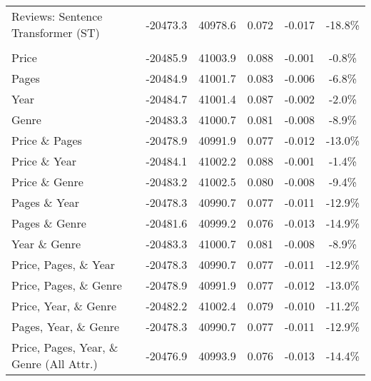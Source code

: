 {\begin{tabular}{l c c c c c}
Reviews: Sentence Transformer (ST) & -20473.3 & 40978.6 & 0.072 & -0.017 & -18.8\% \\
\addlinespace
\multicolumn{6}{l}{\textbf{\textit{Panel C. Attribute-Based Mixed Logit Models}}} \\
\addlinespace
Price & -20485.9 & 41003.9 & 0.088 & -0.001 & -0.8\% \\
Pages & -20484.9 & 41001.7 & 0.083 & -0.006 & -6.8\% \\
Year & -20484.7 & 41001.4 & 0.087 & -0.002 & -2.0\% \\
Genre & -20483.3 & 41000.7 & 0.081 & -0.008 & -8.9\% \\
Price \& Pages & -20478.9 & 40991.9 & 0.077 & -0.012 & -13.0\% \\
Price \& Year & -20484.1 & 41002.2 & 0.088 & -0.001 & -1.4\% \\
Price \& Genre & -20483.2 & 41002.5 & 0.080 & -0.008 & -9.4\% \\
Pages \& Year & -20478.3 & 40990.7 & 0.077 & -0.011 & -12.9\% \\
Pages \& Genre & -20481.6 & 40999.2 & 0.076 & -0.013 & -14.9\% \\
Year \& Genre & -20483.3 & 41000.7 & 0.081 & -0.008 & -8.9\% \\
Price, Pages, \& Year & -20478.3 & 40990.7 & 0.077 & -0.011 & -12.9\% \\
Price, Pages, \& Genre & -20478.9 & 40991.9 & 0.077 & -0.012 & -13.0\% \\
Price, Year, \& Genre & -20482.2 & 41002.4 & 0.079 & -0.010 & -11.2\% \\
Pages, Year, \& Genre & -20478.3 & 40990.7 & 0.077 & -0.011 & -12.9\% \\
Price, Pages, Year, \& Genre (All Attr.) & -20476.9 & 40993.9 & 0.076 & -0.013 & -14.4\% \\
\bottomrule
\end{tabular}
}